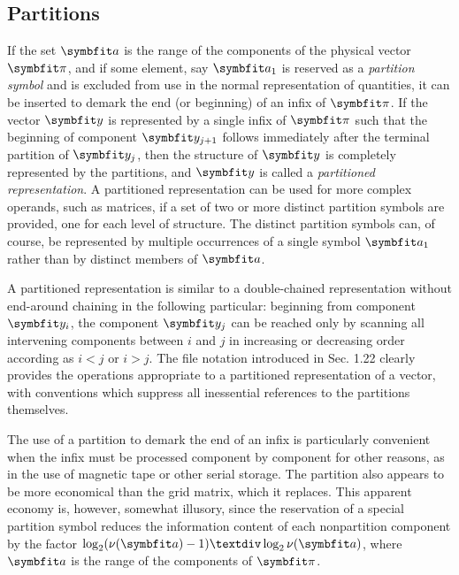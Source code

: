 \subsection*{Partitions}

\par If the set $\vect{a}$ is the range of the components of the physical vector $\vect{\pi}$, and if some element, say $\vect{a}_1$ is reserved as a \textit{partition symbol} and is excluded from use in the normal representation of quantities, it can be inserted to demark the end (or beginning) of an infix of $\vect{\pi}$. If the vector $\vect{y}$ is represented by a single infix of $\vect{\pi}$ such that the beginning of component $\vect{y}_{j+1}$ follows immediately after the terminal partition of $\vect{y}_j$, then the structure of $\vect{y}$ is completely represented by the partitions, and $\vect{y}$ is called a \textit{partitioned representation}. A partitioned representation can be used for more complex operands, such as matrices, if a set of two or more distinct partition symbols are provided, one for each level of structure. The distinct partition symbols can, of course, be represented by multiple occurrences of a single symbol $\vect{a}_1$ rather than by distinct members of $\vect{a}$.

\par A partitioned representation is similar to a double-chained representation without end-around chaining in the following particular: beginning from component $\vect{y}_i$, the component $\vect{y}_j$ can be reached only by scanning all intervening components between $i$ and $j$ in increasing or decreasing order according as $i < j$ or $i > j$. The file notation introduced in Sec. 1.22 clearly provides the operations appropriate to a partitioned representation of a vector, with conventions which suppress all inessential references to the partitions themselves.

\par The use of a partition to demark the end of an infix is particularly convenient when the infix must be processed component by component for other reasons, as in the use of magnetic tape or other serial storage. The partition also appears to be more economical than the grid matrix, which it replaces. This apparent economy is, however, somewhat illusory, since the reservation of a special partition symbol reduces the information content of each nonpartition component by the factor $\log_2(\nu(\vect{a}) - 1) ÷ \log_2 \nu(\vect{a})$, where $\vect{a}$ is the range of the components of $\vect{\pi}$.

